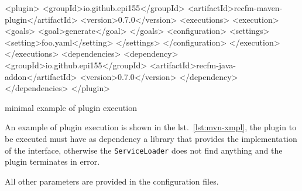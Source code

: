 
\begin{elisting}[!htb]
\begin{xmlcode}
<plugin>
    <groupId>io.github.epi155</groupId>
    <artifactId>recfm-maven-plugin</artifactId>
    <version>0.7.0</version>
    <executions>
        <execution>
            <goals>
                <goal>generate</goal>
            </goals>
            <configuration>
                <settings>
                    <setting>foo.yaml</setting>
                </settings>
            </configuration>
        </execution>
    </executions>
    <dependencies>
        <dependency>
            <groupId>io.github.epi155</groupId>
            <artifactId>recfm-java-addon</artifactId>
            <version>0.7.0</version>
        </dependency>
    </dependencies>
</plugin>
\end{xmlcode}
\caption{minimal example of plugin execution}
\label{lst:mvn-xmpl}
\end{elisting}
An example of plugin execution is shown in the lst.~\ref{lst:mvn-xmpl}, the 
plugin to be executed must have as dependency a library that provides the 
implementation of the interface, otherwise the \verb!ServiceLoader! does not 
find anything and the plugin terminates in error.

All other parameters are provided in the configuration files.
